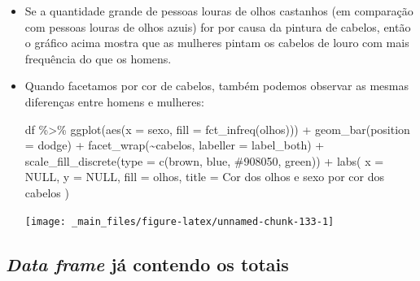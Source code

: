 \documentclass[
  11pt]{report}
\newenvironment{Shaded}{\begin{snugshade}}{\end{snugshade}}
\newcommand{\AttributeTok}[1]{\textcolor[rgb]{0.77,0.63,0.00}{#1}}
\newcommand{\ConstantTok}[1]{\textcolor[rgb]{0.00,0.00,0.00}{#1}}
\newcommand{\FunctionTok}[1]{\textcolor[rgb]{0.00,0.00,0.00}{#1}}
\newcommand{\NormalTok}[1]{#1}
\newcommand{\SpecialCharTok}[1]{\textcolor[rgb]{0.00,0.00,0.00}{#1}}
\newcommand{\StringTok}[1]{\textcolor[rgb]{0.31,0.60,0.02}{#1}}
\renewenvironment{Shaded}{
    \begin{mdframed}[%
      roundcorner=2pt,%
      innerleftmargin=5pt,%
      innerrightmargin=5pt,%
      topline=true,%
      leftline=true,%
      rightline=true,%
      bottomline=true,%
      linewidth=0.5pt,%
      linecolor=black!20,%
      backgroundcolor=black!2,%
      skipabove=2ex,%
      skipbelow=2.5ex%
    ]%
  }
  {
    \end{mdframed}
  }
\begin{document}
\begin{itemize}
\item
  Se a quantidade grande de pessoas louras de olhos castanhos (em comparação com pessoas louras de olhos azuis) for por causa da pintura de cabelos, então o gráfico acima mostra que as mulheres pintam os cabelos de louro com mais frequência do que os homens.
\item
  Quando facetamos por cor de cabelos, também podemos observar as mesmas diferenças entre homens e mulheres:

\begin{Shaded}
\begin{Highlighting}[]
\NormalTok{df }\SpecialCharTok{\%\textgreater{}\%} 
  \FunctionTok{ggplot}\NormalTok{(}\FunctionTok{aes}\NormalTok{(}\AttributeTok{x =}\NormalTok{ sexo, }\AttributeTok{fill =} \FunctionTok{fct\_infreq}\NormalTok{(olhos))) }\SpecialCharTok{+}
    \FunctionTok{geom\_bar}\NormalTok{(}\AttributeTok{position =} \StringTok{\textquotesingle{}dodge\textquotesingle{}}\NormalTok{) }\SpecialCharTok{+}
    \FunctionTok{facet\_wrap}\NormalTok{(}\SpecialCharTok{\textasciitilde{}}\NormalTok{cabelos, }\AttributeTok{labeller =}\NormalTok{ label\_both) }\SpecialCharTok{+}
    \FunctionTok{scale\_fill\_discrete}\NormalTok{(}\AttributeTok{type =} \FunctionTok{c}\NormalTok{(}\StringTok{\textquotesingle{}brown\textquotesingle{}}\NormalTok{, }\StringTok{\textquotesingle{}blue\textquotesingle{}}\NormalTok{, }\StringTok{\textquotesingle{}\#908050\textquotesingle{}}\NormalTok{, }\StringTok{\textquotesingle{}green\textquotesingle{}}\NormalTok{)) }\SpecialCharTok{+}
    \FunctionTok{labs}\NormalTok{(}
      \AttributeTok{x =} \ConstantTok{NULL}\NormalTok{,}
      \AttributeTok{y =} \ConstantTok{NULL}\NormalTok{,}
      \AttributeTok{fill =} \StringTok{\textquotesingle{}olhos\textquotesingle{}}\NormalTok{,}
      \AttributeTok{title =} \StringTok{\textquotesingle{}Cor dos olhos e sexo por cor dos cabelos\textquotesingle{}}
\NormalTok{    )}
\end{Highlighting}
\end{Shaded}

  \begin{center}\texttt{[image: \_main\_files/figure-latex/unnamed-chunk-133-1]} \end{center}
\end{itemize}

\hypertarget{data-frame-juxe1-contendo-os-totais}{%
\subsection{\texorpdfstring{\emph{Data frame} já contendo os totais}{Data frame já contendo os totais}}\label{data-frame-juxe1-contendo-os-totais}}
\end{document}
